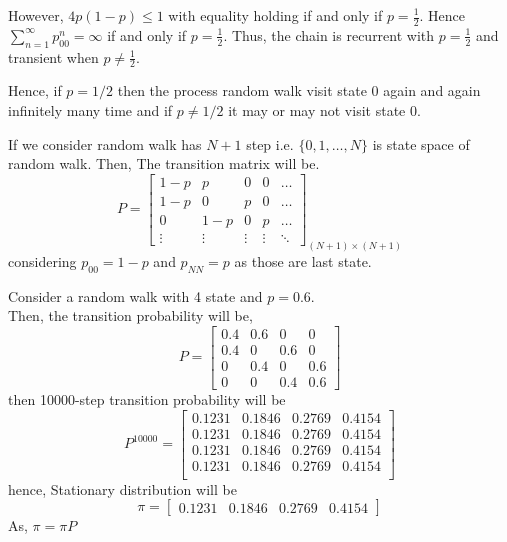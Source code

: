 However, $ 4p(1-p)\le 1 $ with equality holding if and only if $ p=\frac{1}{2} $. Hence $ \sum_{n=1}^{\infty} p^{n}_{00}=\infty $ 
if and only if $ p=\frac{1}{2} $. Thus, the chain is recurrent with $ p=\frac{1}{2} $ and transient when  $ p\neq \frac{1}{2} $.

Hence, if $ p= 1/2 $ then the process random walk visit state 0 again and again infinitely many time and if  $ p \neq 1/2 $ it may or may 
not visit state 0.

If we consider random walk has  $ N+1 $ step i.e.  $ \{0,1,\ldots,N\} $ is state space of random walk.
Then, The transition matrix will be.
\[
    P = 
    \begin{bmatrix}
        1-p & p & 0 & 0 & \ldots\\ 
        1-p & 0 & p & 0 & \ldots\\ 
        0 & 1-p & 0 & p & \ldots\\ 
        \vdots & \vdots & \vdots & \vdots & \ddots
    \end{bmatrix}_{(N+1)\times(N+1)}
\]
considering $ p_{00} = 1-p $ and $ p_{N N} = p $ as those are last state.

\begin{example}
    Consider a random walk with 4 state and $ p = 0.6 $.\\ 
    Then, the transition probability will be,
    \[
        P = 
        \begin{bmatrix}
            0.4 & 0.6 & 0 & 0\\ 
            0.4 & 0 & 0.6 & 0\\ 
            0 & 0.4 & 0 & 0.6\\ 
            0 & 0 & 0.4 & 0.6
        \end{bmatrix} 
    \]
    then 10000-step transition probability will be
    \[
        P^{10000}=
        \begin{bmatrix}
            0.1231 & 0.1846 & 0.2769 & 0.4154 \\
            0.1231 & 0.1846 & 0.2769 & 0.4154 \\
            0.1231 & 0.1846 & 0.2769 & 0.4154 \\
            0.1231 & 0.1846 & 0.2769 & 0.4154 \\
        \end{bmatrix}
    \]
    hence, Stationary distribution will be 
    \[
        \pi = 
        \begin{bmatrix}
            0.1231 &   0.1846  &  0.2769  &  0.4154
        \end{bmatrix} 
    \]
    As, $ \pi = \pi P $
\end{example}

